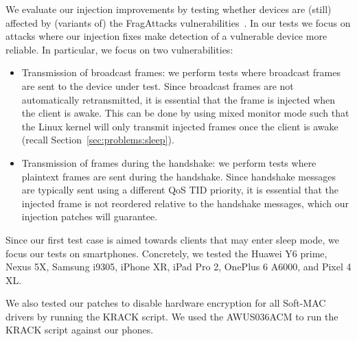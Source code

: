 \documentclass[sigconf]{acmart}
\newcommand{\red}[1]{\textcolor{red}{#1}}
\begin{document}
We evaluate our injection improvements by testing whether devices are (still) affected by (variants of) the FragAttacks vulnerabilities~\cite{vanhoef-usenix2021-fragattacks}.
In our tests we focus on attacks where our injection fixes make detection of a vulnerable device more reliable.
In particular, we focus on two vulnerabilities:
\begin{itemize}
	\item Transmission of broadcast frames: we perform tests where broadcast frames are sent to the device under test.
	Since broadcast frames are not automatically retransmitted, it is essential that the frame is injected when the client is awake.
	This can be done by using mixed monitor mode such that the Linux kernel will only transmit injected frames once the client is awake (recall Section~\ref{sec:problems:sleep}).

	\item Transmission of frames during the handshake: we perform tests where plaintext frames are sent during the handshake.
	Since handshake messages are typically sent using a different QoS TID priority, it is essential that the injected frame is not reordered relative to the handshake messages, which our injection patches will guarantee.
\end{itemize}
%
%
%
Since our first test case is aimed towards clients that may enter sleep mode, we focus our tests on smartphones.
Concretely, we tested the Huawei Y6 prime, Nexus 5X, Samsung i9305, iPhone XR, iPad Pro 2, OnePlus 6 A6000, and Pixel 4 XL.

We also tested our patches to disable hardware encryption for all Soft-MAC drivers by running the KRACK script.
We used the AWUS036ACM to run the KRACK script against our phones.
\end{document}
